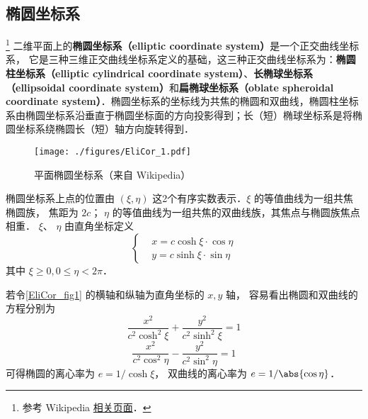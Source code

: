 
\begin{issues}
\end{issues}


\subsection{椭圆坐标系}
\footnote{参考 Wikipedia \href{https://en.wikipedia.org/wiki/Elliptic_coordinate_system}{相关页面}．}
二维平面上的\textbf{椭圆坐标系（elliptic coordinate system）}是一个正交曲线坐标系， 它是三种三维正交曲线坐标系定义的基础，这三种正交曲线坐标系为：\textbf{椭圆柱坐标系（elliptic cylindrical coordinate system）}、\textbf{长椭球坐标系（ellipsoidal coordinate system）}和\textbf{扁椭球坐标系（oblate spheroidal coordinate system）}．椭圆坐标系的坐标线为共焦的椭圆和双曲线，椭圆柱坐标系由椭圆坐标系沿垂直于椭圆坐标面的方向投影得到；长（短）椭球坐标系是将椭圆坐标系绕椭圆长（短）轴方向旋转得到．

\begin{figure}[ht]
\centering
\texttt{[image: ./figures/EliCor\_1.pdf]}
\caption{平面椭圆坐标系（来自 Wikipedia）} \label{EliCor_fig1}
\end{figure}

椭圆坐标系上点的位置由 $(\xi,\eta)$ 这2个有序实数表示．$\xi$ 的等值曲线为一组共焦椭圆族， 焦距为 $2c$； $\eta$ 的等值曲线为一组共焦的双曲线族，其焦点与椭圆族焦点相重． $\xi$、 $\eta$ 由直角坐标定义
\begin{equation}\label{EliCor_eq3}
\left\{\begin{aligned}
&x=c\cosh\xi\cdot\cos\eta\\
&y=c\sinh\xi\cdot\sin\eta
\end{aligned}\right.
\end{equation}
其中 $\xi\geq0,0\leq\eta<2\pi$．

若令\autoref{EliCor_fig1} 的横轴和纵轴为直角坐标的 $x, y$ 轴， 容易看出椭圆和双曲线的方程分别为
\begin{equation}\label{EliCor_eq4}
\frac{x^2}{c^2\cosh^2\xi}+\frac{y^2}{c^2\sinh^2\xi}=1
\end{equation}
\begin{equation}\label{EliCor_eq5}
\frac{x^2}{c^2\cos^2\eta}-\frac{y^2}{c^2\sin^2\eta}=1
\end{equation}
可得椭圆的离心率为 $e = 1/\cosh \xi$， 双曲线的离心率为 $e = 1/\abs{\cos \eta}$．

